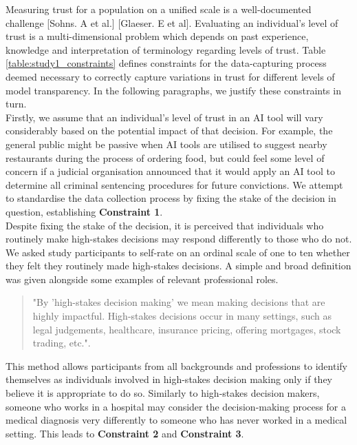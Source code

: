 \documentclass[manuscript,screen,review]{acmart}
\begin{document}
Measuring trust for a population on a unified scale is a well-documented challenge [Sohns. A et al.] [Glaeser. E et al]. Evaluating an individual's level of trust is a multi-dimensional problem which depends on past experience, knowledge and interpretation of terminology regarding levels of trust. Table \ref{table:study1_constraints} defines constraints for the data-capturing process deemed necessary to correctly capture variations in trust for different levels of model transparency. In the following paragraphs, we justify these constraints in turn.\\

 Firstly, we assume that an individual's level of trust in an AI tool will vary considerably based on the potential impact of that decision. For example, the general public might be passive when AI tools are utilised to suggest nearby restaurants during the process of ordering food, but could feel some level of concern if a judicial organisation announced that it would apply an AI tool to determine all criminal sentencing procedures for future convictions. We attempt to standardise the data collection process by fixing the stake of the decision in question, establishing \textbf{Constraint 1}. \\
 
Despite fixing the stake of the decision, it is perceived that individuals who routinely make high-stakes decisions may respond differently to those who do not. We asked study participants to self-rate on an ordinal scale of one to ten whether they felt they routinely made high-stakes decisions. A simple and broad definition was given alongside some examples of relevant professional roles.\begin{quote}
    "By 'high-stakes decision making' we mean making decisions that are highly impactful. High-stakes decisions occur in many settings, such as legal judgements, healthcare, insurance pricing, offering mortgages, stock trading, etc.".
\end{quote}

This method allows participants from all backgrounds and professions to identify themselves as individuals involved in high-stakes decision making only if they believe it is appropriate to do so. Similarly to high-stakes decision makers, someone who works in a hospital may consider the decision-making process for a medical diagnosis very differently to someone who has never worked in a medical setting. This leads to \textbf{Constraint 2} and \textbf{Constraint 3}. \\
\end{document}
